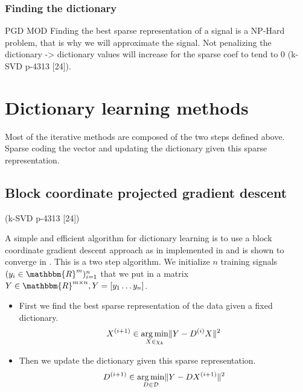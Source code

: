 \documentclass[a4paper,11pt]{article}
\newcommand{\RR}{\mathbbm{R}} %
\DeclarePairedDelimiter\norm{\lVert}{\rVert} %
\DeclareMathOperator*{\argmin}{arg\,min} %
\begin{document}
\subsubsection{Finding the dictionary}
PGD MOD
Finding the best sparse representation of a signal is a NP-Hard problem, that is why we will approximate the signal.
Not penalizing the dictionary -> dictionary values will increase for the sparse coef to tend to 0
\cite{olshausen97} (k-SVD p-4313 [24]).
\section{Dictionary learning methods}
Most of the iterative methods are composed of the two steps defined above.
Sparse coding the vector and updating the dictionary given this sparse representation.


\subsection{Block coordinate projected gradient descent}
\cite{olshausen97} (k-SVD p-4313 [24])

A simple and efficient algorithm for dictionary learning is to use a block coordinate gradient descent approach as in implemented in \cite{nt4} and is shown to converge in \cite{tseng01}.
This is a two step algorithm.
We initialize $n$ training signals $(y_i \in \RR^m)_{i=1}^{n}$
that we put in a matrix $Y \in \RR^{m \times n}, Y = [y_1 \ldots y_n]$.
\begin{itemize}
  \item First we find the best sparse representation of the data given a fixed dictionary.
  	\begin{equation} \label{eq:pgd1}
      X^{(i+1)} \in \argmin_{X \in \chi_k} \norm{Y - D^{(i)}X}^2
	\end{equation}
  \item Then we update the dictionary given this sparse representation.
  	\begin{equation} \label{eq:pgd2}
      D^{(i+1)} \in \argmin_{D \in \mathcal{D}} \norm{Y - DX^{(i+1)}}^2
	\end{equation}
\end{itemize}
\end{document}
